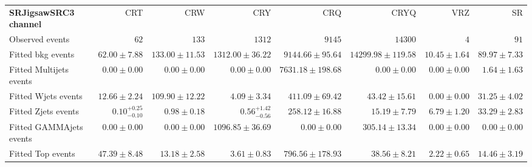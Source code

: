 

\begin{table}
\begin{center}
\setlength{\tabcolsep}{0.0pc}
{\tiny
\begin{tabular*}{\textwidth}{@{\extracolsep{\fill}}lrrrrrrr}
\noalign{\smallskip}\hline\noalign{\smallskip}
{\bf SRJigsawSRC3 channel}           & CRT            & CRW            & CRY            & CRQ            & CRYQ            & VRZ            & SR              \\[-0.05cm]
\noalign{\smallskip}\hline\noalign{\smallskip}
Observed events          & $62$              & $133$              & $1312$              & $9145$              & $14300$              & $4$              & $91$                    \\
\noalign{\smallskip}\hline\noalign{\smallskip}
Fitted bkg events         & $62.00 \pm 7.88$          & $133.00 \pm 11.53$          & $1312.00 \pm 36.22$          & $9144.66 \pm 95.64$          & $14299.98 \pm 119.58$          & $10.45 \pm 1.64$          & $89.97 \pm 7.33$              \\
\noalign{\smallskip}\hline\noalign{\smallskip}
        Fitted Multijets events         & $0.00 \pm 0.00$          & $0.00 \pm 0.00$          & $0.00 \pm 0.00$          & $7631.18 \pm 198.68$          & $0.00 \pm 0.00$          & $0.00 \pm 0.00$          & $1.64 \pm 1.63$              \\
        Fitted Wjets events         & $12.66 \pm 2.24$          & $109.90 \pm 12.22$          & $4.09 \pm 3.34$          & $411.09 \pm 69.42$          & $43.42 \pm 15.61$          & $0.00 \pm 0.00$          & $31.25 \pm 4.02$              \\
        Fitted Zjets events         & $0.10_{-0.10}^{+0.25}$          & $0.98 \pm 0.18$          & $0.56_{-0.56}^{+1.42}$          & $258.12 \pm 16.88$          & $15.19 \pm 7.79$          & $6.79 \pm 1.20$          & $33.29 \pm 2.83$              \\
        Fitted GAMMAjets events         & $0.00 \pm 0.00$          & $0.00 \pm 0.00$          & $1096.85 \pm 36.69$          & $0.00 \pm 0.00$          & $305.14 \pm 13.34$          & $0.00 \pm 0.00$          & $0.00 \pm 0.00$              \\
        Fitted Top events         & $47.39 \pm 8.48$          & $13.18 \pm 2.58$          & $3.61 \pm 0.83$          & $796.56 \pm 178.93$          & $38.56 \pm 8.21$          & $2.22 \pm 0.65$          & $14.46 \pm 3.19$              \\

\end{tabular*}}
\end{center}
\end{table}
